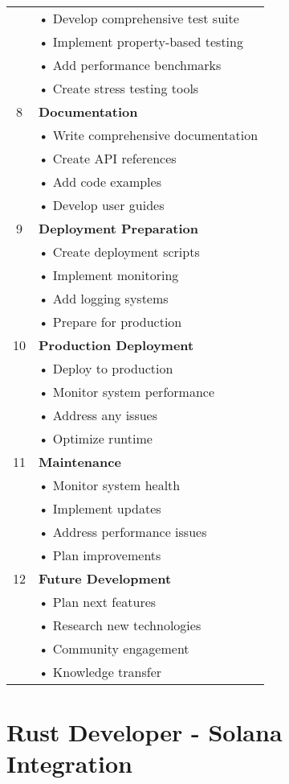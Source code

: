 \documentclass{article}
\begin{document}
\begin{longtable}{|c|p{}|}
& • Develop comprehensive test suite\\
& • Implement property-based testing\\
& • Add performance benchmarks\\
& • Create stress testing tools\\
\hline
8 & \textbf{Documentation}\\
& • Write comprehensive documentation\\
& • Create API references\\
& • Add code examples\\
& • Develop user guides\\
\hline
9 & \textbf{Deployment Preparation}\\
& • Create deployment scripts\\
& • Implement monitoring\\
& • Add logging systems\\
& • Prepare for production\\
\hline
10 & \textbf{Production Deployment}\\
& • Deploy to production\\
& • Monitor system performance\\
& • Address any issues\\
& • Optimize runtime\\
\hline
11 & \textbf{Maintenance}\\
& • Monitor system health\\
& • Implement updates\\
& • Address performance issues\\
& • Plan improvements\\
\hline
12 & \textbf{Future Development}\\
& • Plan next features\\
& • Research new technologies\\
& • Community engagement\\
& • Knowledge transfer\\
\hline
\end{longtable}

\section*{Rust Developer - Solana Integration}
\end{document}
